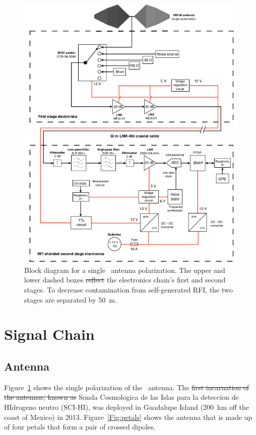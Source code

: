 \begin{figure}
	\centering
	\includegraphics[width=\linewidth]{Figures/PRZIM_block}
	\caption{Block diagram for a single \prizm\ antenna polarization. The upper and lower dashed boxes \st{reflect}  the electronics chain's first and second stages. To decrease contamination from self-generated RFI, the 
		two stages are separated by \SI{50}{\meter}. }
	\label{Fig:PRZIM_block}
\end{figure}

\section{Signal Chain}

\subsection{Antenna}

Figure~\ref{Fig:PRZIM_block} shows the  single polarization of the  \prizm\ antenna. The \st{first incarnation of the antennas, known as}  Sonda Cosmologica de las Islas para la deteccion de HIdrogeno neutro (SCI-HI),  was deployed in Guadalupe Island (\SI{200}{\kilo \meter} off the coast of Mexico) in 2013. Figure~\ref{Fig:petals} shows the antenna that is made up of four petals that form a pair of crossed dipoles.


